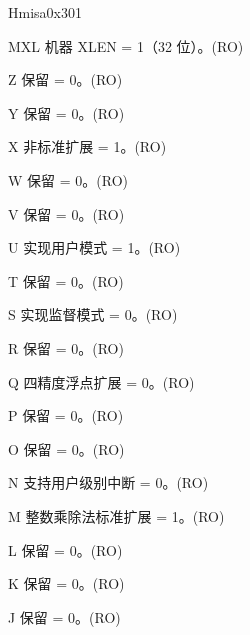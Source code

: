 \begin{register}{H}{misa}{0x301}\label{regdesc:MISA}
%
%
%
%
%
%
%
%
%
%
%
%
%
%
%
%
%
%
%
%
%
%
%
%
%
%
%
%
\regnewline%
\begin{regdesc}\begin{reglist}
\label{fielddesc:MISAMXL}\item [MXL] 机器 XLEN = 1（32 位）。(RO)
\label{fielddesc:MISAZ}\item [Z] 保留 = 0。(RO)
\label{fielddesc:MISAY}\item [Y] 保留 = 0。(RO)
\label{fielddesc:MISAX}\item [X] 非标准扩展 = 1。(RO)
\label{fielddesc:MISAW}\item [W] 保留 = 0。(RO)
\label{fielddesc:MISAV}\item [V] 保留 = 0。(RO)
\label{fielddesc:MISAU}\item [U] 实现用户模式 = 1。(RO)
\label{fielddesc:MISAT}\item [T] 保留 = 0。(RO)
\label{fielddesc:MISAS}\item [S] 实现监督模式 = 0。(RO)
\label{fielddesc:MISAR}\item [R] 保留 = 0。(RO)
\label{fielddesc:MISAQ}\item [Q] 四精度浮点扩展 = 0。(RO)
\label{fielddesc:MISAP}\item [P] 保留 = 0。(RO)
\label{fielddesc:MISAO}\item [O] 保留 = 0。(RO)
\label{fielddesc:MISAN}\item [N] 支持用户级别中断 = 0。(RO)
\label{fielddesc:MISAM}\item [M] 整数乘除法标准扩展 = 1。(RO)
\label{fielddesc:MISAL}\item [L] 保留 = 0。(RO)
\label{fielddesc:MISAK}\item [K] 保留 = 0。(RO)
\label{fielddesc:MISAJ}\item [J] 保留 = 0。(RO)

\end{reglist}
\end{regdesc}
\end{register}
